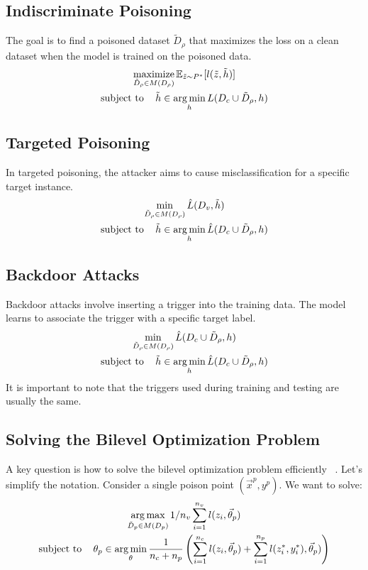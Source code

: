 \documentclass[11pt]{report}
\begin{document}
\subsection{Indiscriminate Poisoning}
The goal is to find a poisoned dataset $\tilde{D}_{\rho}$ that maximizes the loss on a clean dataset when the model is trained on the poisoned data.
\begin{gather}
    \operatorname*{maximize}_{\tilde{D}_{\rho} \in M(D_{\rho})} \mathbb{E}_{\tilde{z} \sim P^*}[l(\tilde{z}, \tilde{h})] \\
    \operatorname{subject\,\,to} \quad \tilde{h} \in \operatorname*{arg\,min}_{h} L(D_c \cup \tilde{D}_{\rho}, h) \nonumber
\end{gather}

\subsection{Targeted Poisoning}
In targeted poisoning, the attacker aims to cause misclassification for a specific target instance.
\begin{gather}
    \operatorname*{min}_{\tilde{D}_{\rho} \in M(D_{\rho})} \hat{L}(D_v, \tilde{h}) \\
    \operatorname{subject\,\,to} \quad \tilde{h} \in \operatorname*{arg\,min}_{h} \hat{L}(D_c \cup \tilde{D}_{\rho}, h) \nonumber
\end{gather}

\subsection{Backdoor Attacks}
Backdoor attacks involve inserting a trigger into the training data. The model learns to associate the trigger with a specific target label.
\begin{gather}
    \operatorname*{min}_{\tilde{D}_{\rho} \in M(D_{\rho})} \hat{L}(D_c \cup \tilde{D}_{\rho}, h) \\
    \operatorname{subject\,\,to} \quad \tilde{h} \in \operatorname*{arg\,min}_{h} \hat{L}(D_c \cup \tilde{D}_{\rho}, h) \nonumber
\end{gather}
It is important to note that the triggers used during training and testing are usually the same.

\subsection{Solving the Bilevel Optimization Problem}
A key question is how to solve the bilevel optimization problem efficiently ~\cite{ye2022bomebileveloptimizationeasy}. Let's simplify the notation. Consider a single poison point $(\vec{x}^p, y^p)$. We want to solve:\\
\begin{gather}
    \operatorname*{arg\,max}_{\tilde{D}_p \in M(D_p)} 1/n_v \sum_{i=1}^{n_v} l(z_i, \vec\theta_p) \\
    \operatorname{subject\,\,to} \quad \theta_p \in \operatorname*{arg\,min}_{\theta} \frac{1}{n_c+n_p} \left( \sum_{i=1}^{n_c} l(z_i, \vec\theta_p) + \sum_{i=1}^{n_p} l({z}^*_i, {y}^*_i), \vec\theta_p) \right) \nonumber
\end{gather}
\end{document}
